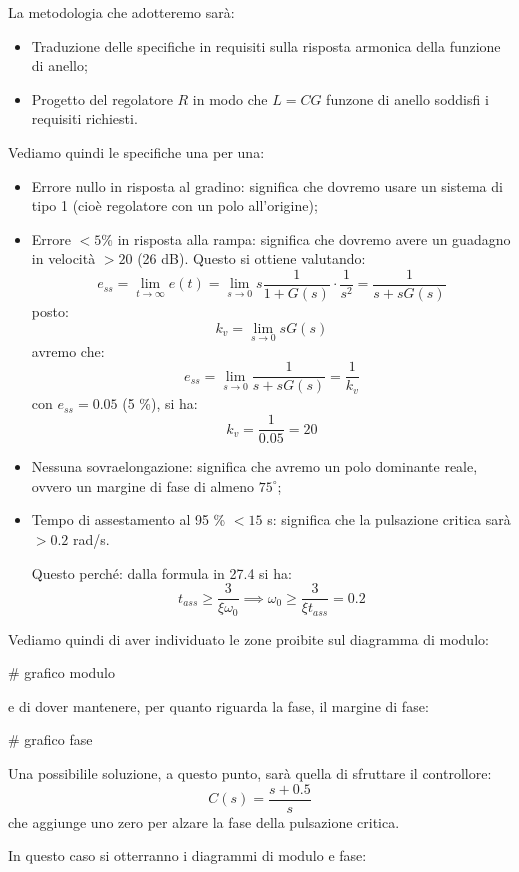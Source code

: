 \documentclass[a4paper,11pt]{article}
\begin{document}
La metodologia che adotteremo sarà:
\begin{itemize}
	\item Traduzione delle specifiche in requisiti sulla risposta armonica della funzione di anello;
	\item Progetto del regolatore $R$ in modo che $L = CG$ funzone di anello soddisfi i requisiti richiesti.
\end{itemize}

Vediamo quindi le specifiche una per una:
\begin{itemize}
\item Errore nullo in risposta al gradino: significa che dovremo usare un sistema di tipo 1 (cioè regolatore con un polo all'origine);
\item Errore $< 5\%$ in risposta alla rampa: significa che dovremo avere un guadagno in velocità $> 20$ (26 dB).
	Questo si ottiene valutando:
	$$
	e_{ss} = \lim_{t \rightarrow \infty} e(t) = \lim_{s \rightarrow 0} s \frac{1}{1 + G(s)} \cdot \frac{1}{s^2} = \frac{1}{s + s G(s)}
	$$
	posto:
	$$
	k_v = \lim_{s \rightarrow 0} s G(s)
	$$
	avremo che:
	$$
	e_{ss} = \lim_{s \rightarrow 0} \frac{1}{s + s G(s)} = \frac{1}{k_v}
	$$
	con $e_{ss} = 0.05$ (5 \%), si ha:
	$$
	k_v = \frac{1}{0.05} = 20
	$$
\item Nessuna sovraelongazione: significa che avremo un polo dominante reale, ovvero un margine di fase di almeno $75^\circ$;
\item Tempo di assestamento al 95 \% $< 15$ s: significa che la pulsazione critica sarà $> 0.2$ rad/s.

	Questo perché: dalla formula in 27.4 si ha:
	$$
	t_{ass} \geq \frac{3}{\xi \omega_0} \implies \omega_0 \geq \frac{3}{\xi t_{ass}} = 0.2
	$$
\end{itemize}

Vediamo quindi di aver individuato le zone proibite sul diagramma di modulo:

# grafico modulo

e di dover mantenere, per quanto riguarda la fase, il margine di fase:

# grafico fase

\par\smallskip

Una possibilile soluzione, a questo punto, sarà quella di sfruttare il controllore:
$$
C(s) = \frac{s + 0.5}{s}
$$
che aggiunge uno zero per alzare la fase della pulsazione critica.

In questo caso si otterranno i diagrammi di modulo e fase:
\end{document}
